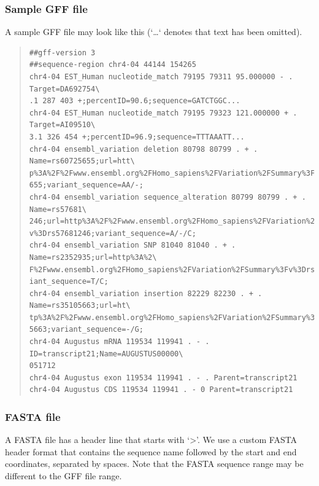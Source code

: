 \documentclass[letterpaper]{article}
\begin{document}
\bigskip

{\color[rgb]{0.30980393,0.5058824,0.7411765}\subsubsection[Sample GFF file]{Sample GFF file}}

{A sample GFF file may look like this
({\textquoteleft}{\dots}{\textquoteleft} denotes that text has been
omitted).}

\bigskip

\begin{quote}
\begin{verbatim}
##gff-version 3
##sequence-region chr4-04 44144 154265
chr4-04 EST_Human nucleotide_match 79195 79311 95.000000 - . Target=DA692754\
.1 287 403 +;percentID=90.6;sequence=GATCTGGC...
chr4-04 EST_Human nucleotide_match 79195 79323 121.000000 + . Target=AI09510\
3.1 326 454 +;percentID=96.9;sequence=TTTAAATT...
chr4-04 ensembl_variation deletion 80798 80799 . + . Name=rs60725655;url=htt\
p%3A%2F%2Fwww.ensembl.org%2FHomo_sapiens%2FVariation%2FSummary%3Fv%3Drs60725\
655;variant_sequence=AA/-;
chr4-04 ensembl_variation sequence_alteration 80799 80799 . + . Name=rs57681\
246;url=http%3A%2F%2Fwww.ensembl.org%2FHomo_sapiens%2FVariation%2FSummary%3F\
v%3Drs57681246;variant_sequence=A/-/C;
chr4-04 ensembl_variation SNP 81040 81040 . + . Name=rs2352935;url=http%3A%2\
F%2Fwww.ensembl.org%2FHomo_sapiens%2FVariation%2FSummary%3Fv%3Drs2352935;var\
iant_sequence=T/C;
chr4-04 ensembl_variation insertion 82229 82230 . + . Name=rs35105663;url=ht\
tp%3A%2F%2Fwww.ensembl.org%2FHomo_sapiens%2FVariation%2FSummary%3Fv%3Drs3510\
5663;variant_sequence=-/G;
chr4-04 Augustus mRNA 119534 119941 . - . ID=transcript21;Name=AUGUSTUS00000\
051712
chr4-04 Augustus exon 119534 119941 . - . Parent=transcript21
chr4-04 Augustus CDS 119534 119941 . - 0 Parent=transcript21
\end{verbatim}
\end{quote}

\bigskip

{\color[rgb]{0.30980393,0.5058824,0.7411765}\subsubsection[FASTA file]{FASTA file}}
\hypertarget{RefHeading1541056909880}{}{
A FASTA file has a header line that starts with
{\textquoteleft}{\textgreater}{\textquoteright}. We use a custom
FASTA header format that contains the sequence name followed by the
start and end coordinates, separated by spaces. Note that the FASTA
sequence range may be different to the GFF file range.}
\end{document}
